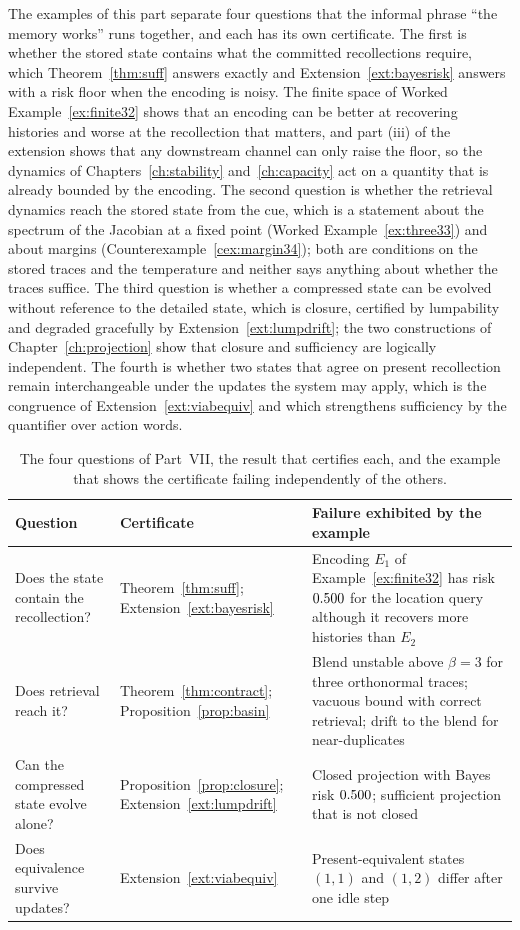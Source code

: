 The examples of this part separate four questions that the informal phrase ``the memory works'' runs together, and each has its own certificate. The first is whether the stored state contains what the committed recollections require, which Theorem~\ref{thm:suff} answers exactly and Extension~\ref{ext:bayesrisk} answers with a risk floor when the encoding is noisy. The finite space of Worked Example~\ref{ex:finite32} shows that an encoding can be better at recovering histories and worse at the recollection that matters, and part (iii) of the extension shows that any downstream channel can only raise the floor, so the dynamics of Chapters~\ref{ch:stability} and~\ref{ch:capacity} act on a quantity that is already bounded by the encoding. The second question is whether the retrieval dynamics reach the stored state from the cue, which is a statement about the spectrum of the Jacobian at a fixed point (Worked Example~\ref{ex:three33}) and about margins (Counterexample~\ref{cex:margin34}); both are conditions on the stored traces and the temperature and neither says anything about whether the traces suffice. The third question is whether a compressed state can be evolved without reference to the detailed state, which is closure, certified by lumpability and degraded gracefully by Extension~\ref{ext:lumpdrift}; the two constructions of Chapter~\ref{ch:projection} show that closure and sufficiency are logically independent. The fourth is whether two states that agree on present recollection remain interchangeable under the updates the system may apply, which is the congruence of Extension~\ref{ext:viabequiv} and which strengthens sufficiency by the quantifier over action words.

\begin{table}[t]
\centering
\small
\renewcommand{\arraystretch}{1.25}
\begin{tabularx}{\textwidth}{@{}p{3.1cm}p{3.6cm}X@{}}
\toprule
Question & Certificate & Failure exhibited by the example \\
\midrule
Does the state contain the recollection? & Theorem~\ref{thm:suff}; Extension~\ref{ext:bayesrisk} & Encoding $E_1$ of Example~\ref{ex:finite32} has risk $0.500$ for the location query although it recovers more histories than $E_2$ \\
Does retrieval reach it? & Theorem~\ref{thm:contract}; Proposition~\ref{prop:basin} & Blend unstable above $\beta=3$ for three orthonormal traces; vacuous bound with correct retrieval; drift to the blend for near-duplicates \\
Can the compressed state evolve alone? & Proposition~\ref{prop:closure}; Extension~\ref{ext:lumpdrift} & Closed projection with Bayes risk $0.500$; sufficient projection that is not closed \\
Does equivalence survive updates? & Extension~\ref{ext:viabequiv} & Present-equivalent states $(1,1)$ and $(1,2)$ differ after one idle step \\
\bottomrule
\end{tabularx}
\caption{The four questions of Part~VII, the result that certifies each, and the example that shows the certificate failing independently of the others.}\label{tab:synth7}
\end{table}

